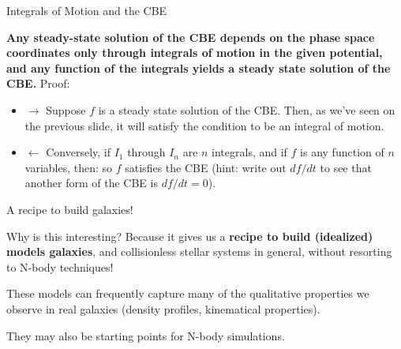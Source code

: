 \documentclass[letterpaper,landscape]{slides}
\begin{document}
\begin{slide}
\begin{center}
{\large \color{red} 
                  Integrals of Motion and the CBE   }
\end{center}

{\bf Any steady-state solution of the CBE depends on the phase space coordinates
only through integrals of motion in the given potential, and any function of the integrals yields a
steady state solution of the CBE.} Proof:

\begin{itemize}

\item $\rightarrow$ Suppose $f$ is a steady state solution of the CBE.  Then, as we've
seen on the previous slide, it will satisfy the condition to be an integral
of motion.

\item $\leftarrow$ Conversely, if $I_1$ through $I_n$ are $n$ integrals, and if $f$ is any function of $n$ variables, then:
so $f$ satisfies the CBE (hint: write out $df/dt$ to see that another form of the CBE is $df/dt = 0$).
\end{itemize}

\vfill
\end{slide}

\begin{slide}
\begin{center}
{\large \color{red} 
                  A recipe to build galaxies!   }
\end{center}

Why is this interesting?  Because it gives us a {\bf recipe to build (idealized)
models galaxies}, and collisionless stellar systems in general, without
resorting to N-body techniques!

These models can frequently capture many of the qualitative properties we
observe in real galaxies (density profiles, kinematical properties).

They may also be starting points for N-body simulations.

\vfill
\end{slide}
\end{document}
